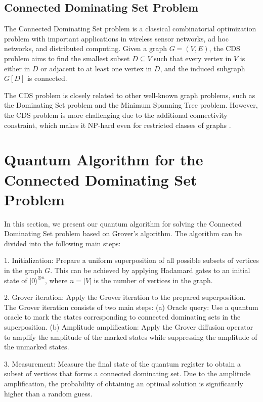 \subsection{Connected Dominating Set Problem}

The Connected Dominating Set problem is a classical combinatorial optimization problem with important applications in wireless sensor networks, ad hoc networks, and distributed computing. Given a graph $G=(V,E)$, the CDS problem aims to find the smallest subset $D \subseteq V$ such that every vertex in $V$ is either in $D$ or adjacent to at least one vertex in $D$, and the induced subgraph $G[D]$ is connected.

The CDS problem is closely related to other well-known graph problems, such as the Dominating Set problem and the Minimum Spanning Tree problem. However, the CDS problem is more challenging due to the additional connectivity constraint, which makes it NP-hard even for restricted classes of graphs \cite{NP_hard}.

\section{Quantum Algorithm for the Connected Dominating Set Problem}
\label{sec:algorithm}

In this section, we present our quantum algorithm for solving the Connected Dominating Set problem based on Grover's algorithm. The algorithm can be divided into the following main steps:

1. Initialization: Prepare a uniform superposition of all possible subsets of vertices in the graph $G$. This can be achieved by applying Hadamard gates to an initial state of $|0\rangle^{\otimes n}$, where $n = |V|$ is the number of vertices in the graph.

2. Grover iteration: Apply the Grover iteration to the prepared superposition. The Grover iteration consists of two main steps: (a) Oracle query: Use a quantum oracle to mark the states corresponding to connected dominating sets in the superposition. (b) Amplitude amplification: Apply the Grover diffusion operator to amplify the amplitude of the marked states while suppressing the amplitude of the unmarked states.

3. Measurement: Measure the final state of the quantum register to obtain a subset of vertices that forms a connected dominating set. Due to the amplitude amplification, the probability of obtaining an optimal solution is significantly higher than a random guess.

